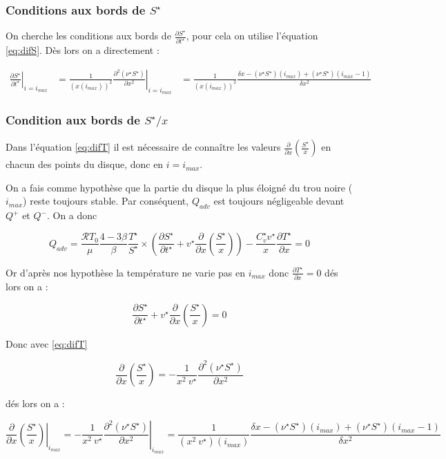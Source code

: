 \subsubsection{Conditions aux bords de $S^{\star}$}
On cherche les conditions aux bords de $\frac{\partial S^{\star}}{\partial t^{\star}}$, pour cela on utilise l'équation \eqref{eq:difS}. Dès lors on a directement :

\begin{eqnarray}
  \left. \frac{\partial S^{\star}}{\partial t^{\star}} \right|_{i=i_{max}}&= \frac{1}{(x(i_{max}))^2} \left. \frac{\partial^2 (\nu^{\star} S^{\star})}{\partial x^2}\right|_{i=i_{max}} &= \frac{1}{(x(i_{max}))^2} \frac{\delta x - (\nu^{\star} S^{\star})(i_{max}) + (\nu^{\star} S^{\star})(i_{max}-1)}{\delta x^2}
\end{eqnarray}


\subsubsection{Condition aux bords de $S^{\star}/x$}

Dans l'équation \eqref{eq:difT} il est nécessaire de connaître les valeurs $\frac{\partial}{\partial x}\left(\frac{S^{\star}}{x}\right)$ en chacun des points du disque, donc en $i=i_{max}$. 

On a fais comme hypothèse que la partie du disque la plus éloigné du trou noire ($i_{max}$) reste toujours stable. Par conséquent, $Q_{adv}$ est toujours négligeable devant $Q^+$ et $Q^-$. On a donc 

\begin{equation}
Q_{adv}=\frac{\mathcal{R} T_0}{\mu} \frac{4-3\beta}{\beta} \frac{T^\star}{S^\star} \times
        \left( \frac{\partial S^\star}{\partial t^\star} + v^\star \frac{\partial}{\partial x} \left(\frac{S^\star}{x}\right) \right) -
        \frac{C_v^\star v^\star}{x} \frac{\partial T^\star}{\partial x}=0
\end{equation}

Or d'après nos hypothèse la température ne varie pas en $i_{max}$ donc $\frac{\partial T^\star}{\partial x} =0$ dés lors on a :


\begin{equation}
  \frac{\partial S^{\star}}{\partial t^{\star}} + v^{\star} \frac{\partial}{\partial x} \left(\frac{S^{\star}}{x}\right)=0
\end{equation}

Donc avec \eqref{eq:difT}

\begin{equation}
  \frac{\partial}{\partial x} \left(\frac{S^{\star}}{x}\right) = -\frac{1}{x^2\ v^{\star}} \frac{\partial^2 (\nu^{\star} S^{\star})}{\partial x^2}
\end{equation}

dés lors on a :

\begin{equation}
\left. \frac{\partial}{\partial x} \left(\frac{S^{\star}}{x}\right) \right|_{i_{max}} = \left. -\frac{1}{x^2\ v^{\star}} \frac{\partial^2 (\nu^{\star} S^{\star})}{\partial x^2} \right|_{i_{max}} = \frac{1}{(x^2\ v^{\star})(i_{max})} \frac{\delta x - (\nu^{\star} S^{\star})(i_{max}) + (\nu^{\star} S^{\star})(i_{max}-1)}{\delta x^2}
\end{equation}
